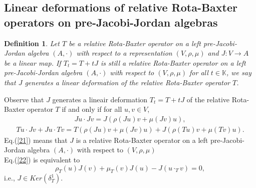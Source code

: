 \documentclass[12pt]{amsart}
\newtheorem{definition}[Theorem]{Definition}
\begin{document}
\subsection{Linear deformations of relative Rota-Baxter operators on pre-Jacobi-Jordan algebras }
\begin{definition}\label{D10}
	Let $ T $ be a relative Rota-Baxter operator on a left pre-Jacobi-Jordan algebra $ (A,\cdot) $ with respect to a representation $ (V, \rho,\mu) $ and $ J : V\to A $ be a linear map. If $ T_{t}=T+tJ $ is still a relative Rota-Baxter operator on a left pre-Jacobi-Jordan algebra $ (A,\cdot) $ with respect to $ (V, \rho,\mu) $ for all $ t\in \mathbb{K} $, we say that $ J $ generates a linear deformation  of the relative Rota-Baxter operator $ T $.  	
\end{definition}
Observe that $J$ generates  a lineair deformation $T_{t}=T+tJ$ of the relative Rota-Baxter operator $ T $ if and only if for all $ u,v\in V $,
\begin{eqnarray}
	\label{21}
	Ju\cdot Jv=J(\rho(Ju)v+\mu(Jv)u),
\end{eqnarray}
\begin{eqnarray}
	\label{22}
	Tu\cdot Jv+Ju\cdot Tv=T(\rho(Ju)v+\mu(Jv)u)+J(\rho(Tu)v+\mu(Tv)u).
\end{eqnarray}
Eq.(\ref{21}) means that $ J $ is a relative Rota-Baxter operator on a left pre-Jacobi-Jordan algebra $ (A,\cdot) $ with respect to $ (V, \rho,\mu) $\\
Eq.(\ref{22}) is equivalent to
$$\rho_T(u)J(v)+\mu_T(v)J(u)-J(u\cdot_T v)=0,$$
i.e., $J\in Ker(\delta_T^1).$ \\
\end{document}
